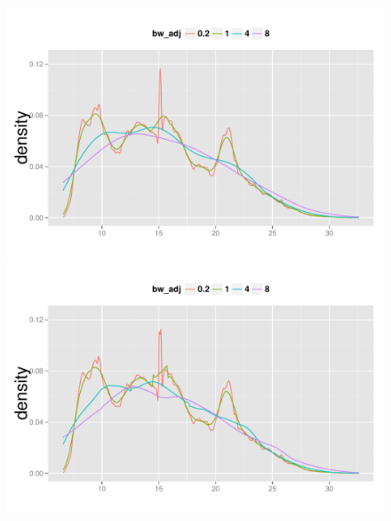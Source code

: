 \begin{figure}
\begin{minipage}[t]{0.33\textwidth}
  \end{minipage}
  \begin{minipage}[t]{0.33\textwidth}
    \centering
    \includegraphics[width=\textwidth,height=\textwidth]{fig/Temperature_optcosine.pdf}
  \end{minipage}
  \begin{minipage}[t]{0.34\textwidth}
    \centering
    \includegraphics[width=\textwidth,height=\textwidth]{fig/Temperature_rectangular.pdf}

\end{minipage}
\end{figure}

